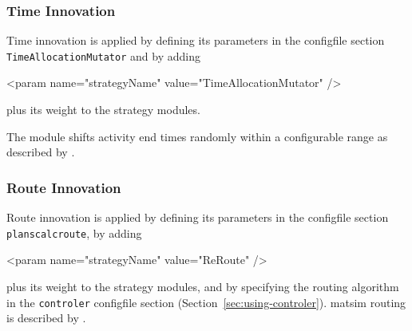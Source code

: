 
\subsubsection{Time Innovation}
\label{sec:timechoice}
Time innovation is applied by defining its parameters in the \gls{configfile} section \lstinline|TimeAllocationMutator| and by adding 
%
\begin{xml}
	<param name="strategyName" value="TimeAllocationMutator" />
\end{xml}
%
plus its weight to the strategy modules.

The module shifts activity end times randomly within a configurable range as described by \citet[][]{BalmerEtAl_Timmermans_2005, Raney_PhDThesis_2005, Balmer_unpub_VSP_2004, BalmerEtAl_unpub_EIRASS_2004, BalmerEtAl_unpub_STRC_2004}. %

\subsubsection{Route Innovation}
\label{sec:routechoice}

Route innovation is applied by defining its parameters in the \gls{configfile} section \lstinline|planscalcroute|, by adding 
%
\begin{xml}
	<param name="strategyName" value="ReRoute" />
\end{xml}
%
plus its weight to the strategy modules, and by specifying the routing algorithm in the \lstinline|controler| \gls{configfile} section (Section~\ref{sec:using-controler}).
\gls{matsim} routing is described by \citet[]{LefebvreBalmer_STRC_2007, LefebvreBalmer_TechRep_IVT_2007}. 

%

